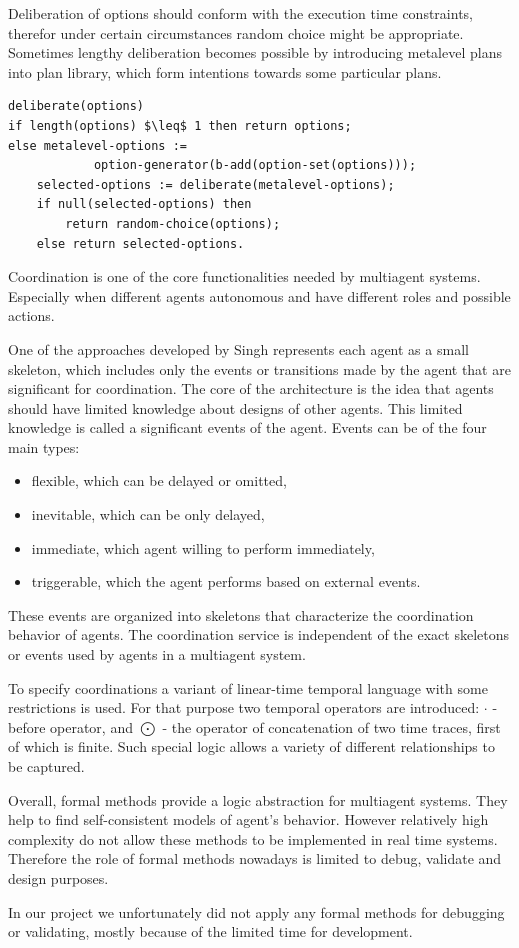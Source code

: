 Deliberation of options should conform with the execution time constraints, therefor under certain circumstances random choice might be appropriate. Sometimes lengthy deliberation becomes possible by introducing metalevel plans into plan library, which form intentions towards some particular plans.
%
\begin{lstlisting}[mathescape]
deliberate(options)
if length(options) $\leq$ 1 then return options;
else metalevel-options :=
            option-generator(b-add(option-set(options)));
    selected-options := deliberate(metalevel-options);
    if null(selected-options) then
        return random-choice(options);
    else return selected-options.
\end{lstlisting}

Coordination is one of the core functionalities needed by multiagent systems. Especially when different agents autonomous and have different roles and possible actions.

One of the approaches developed by Singh \cite{Singh_97} represents each agent as a small skeleton, which includes only the events or
transitions made by the agent that are significant for coordination. The core of the architecture is the idea that agents should have limited knowledge about designs of other agents. This limited knowledge is called a significant events of the agent. Events can be of the four main types:
\begin{itemize}
  \item flexible, which can be delayed or omitted,
  \item inevitable, which can be only delayed,
  \item immediate, which agent willing to perform immediately,
  \item triggerable, which the agent performs based on external events.
\end{itemize}
These events are organized into skeletons that characterize the coordination behavior of agents. The coordination service is independent of the exact skeletons or events used by agents in a multiagent system.

To specify coordinations a variant of linear-time temporal language with some restrictions is used. For that purpose two temporal operators are introduced: $\cdot$ - before operator, and $\bigodot$ - the operator of concatenation of two time traces, first of which is finite. Such special logic allows a variety of different relationships to be captured. 

Overall, formal methods provide a logic abstraction for multiagent systems. They help to find self-consistent models of agent's behavior. However relatively high complexity do not allow these methods to be implemented in real time systems. Therefore the role of formal methods nowadays is limited to debug, validate and design purposes.

In our project we unfortunately did not apply any formal methods for debugging or validating, mostly because of the limited time for development.